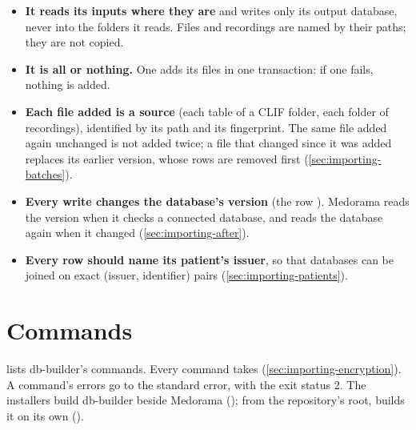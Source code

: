 \begin{itemize}
\item \textbf{It reads its inputs where they are} and writes only its output database, never into
  the folders it reads. Files and recordings are named by their paths; they are not copied.
\item \textbf{It is all or nothing.} One  adds its files in one transaction: if
  one fails, nothing is added.
\item \textbf{Each file added is a source} (each table of a CLIF folder, each folder of
  recordings), identified by its path and its fingerprint. The same file added again unchanged is
  not added twice; a file that changed since it was added replaces its earlier version, whose rows
  are removed first (\cref{sec:importing-batches}).
\item \textbf{Every write changes the database's version} (the  row ).
  Medorama reads the version when it checks a connected database, and reads the database again
  when it changed (\cref{sec:importing-after}).
\item \textbf{Every row should name its patient's issuer}, so that databases can be joined on
  exact (issuer, identifier) pairs (\cref{sec:importing-patients}).
\end{itemize}

\section{Commands}
\label{sec:importing-commands}

 lists db-builder's commands. Every command takes
 (\cref{sec:importing-encryption}). A command's errors go to the standard error,
with the exit status 2. The installers build db-builder beside Medorama
(); from the repository's root,  builds it on its own ().

